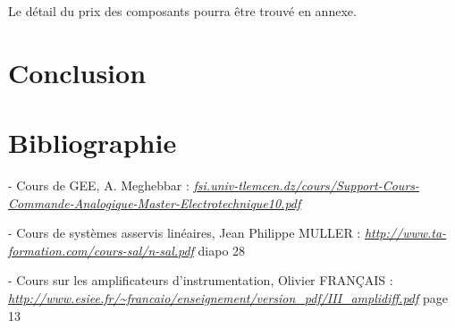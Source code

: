 \documentclass[11pt, french]{article} %
\begin{document}
 
Le détail du prix des composants pourra être trouvé en annexe. 

\section{Conclusion}

%
%
%
%
%

\pagebreak
\section{Bibliographie}
\medskip
- Cours de GEE, A. Meghebbar :
\newline \textit{\underline{\url{fsi.univ-tlemcen.dz/cours/Support-Cours-Commande-Analogique-Master-Electrotechnique10.pdf}}} 

- Cours de systèmes asservis linéaires, Jean Philippe MULLER : 
\newline \textit{\underline{\url{http://www.ta-formation.com/cours-sal/n-sal.pdf}}} diapo 28

- Cours sur les amplificateurs d'instrumentation, Olivier FRANÇAIS : 
\newline \textit{\underline{\url{http://www.esiee.fr/~francaio/enseignement/version_pdf/III_amplidiff.pdf}}} page 13
\end{document}
